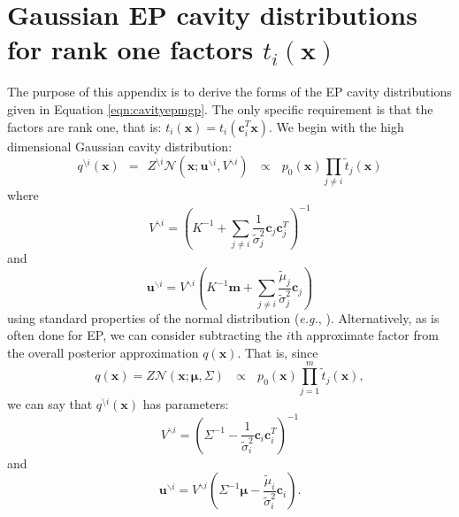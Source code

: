 \documentclass[twoside,11pt]{article}
\def\x{{\mathbf x}}
\def\c{{\mathbf c}}
\def\u{{\mathbf u}}
\def\m{{\mathbf m}}
\def\boldmu{\bm{\mu}}
\newcommand{\wo}{\setminus}
\begin{document}

\newpage

\appendix



\newpage

\appendix

\section{Gaussian EP cavity distributions for rank one factors $t_i(\x)$}
\label{sec:rank1cavity}

The purpose of this appendix is to derive the forms of the EP cavity distributions given in Equation \ref{eqn:cavityepmgp}.  The only specific requirement is that the factors are rank one, that is: $t_i(\x) = t_i(\c_i^T\x)$. We begin with the high dimensional Gaussian cavity distribution:
\begin{equation}
q^{\wo i}(\x) ~~=~~ Z^{\wo i}\mathcal{N}(\x; \u^{\backslash i}, V^{\backslash i}) ~~~\propto~~~ p_0(\x) \prod_{j\ne i} \tilde{t}_j(\x)
\end{equation}
where
%
\begin{equation}
V^{\backslash i} = \left(K^{-1}  + \sum_{j\ne i} \frac{1}{\tilde{\sigma}_j^2} \c_j\c_j^T\right)^{-1}
\end{equation}
%
and
%
\begin{equation}
\u^{\backslash i} = V^{\backslash i}\left(K^{-1}\m  + \sum_{j\ne i} \frac{\tilde{\mu}_j}{\tilde{\sigma}_j^2} \c_j\right)
\end{equation}
using standard properties of the normal distribution ({\it e.g.}, \cite{rasmussenBook}).  Alternatively, as is often done for EP, we can consider subtracting the $i$th approximate factor from the overall posterior approximation $q(\x)$.  That is, since
\begin{equation}
q(\x) = Z\mathcal{N}(\x; \boldmu, \Sigma) ~~~\propto~~~ p_0(\x) \overset{m}{\prod_{j=1}} \tilde{t}_j(\x),
\end{equation}
we can say that $q^{\wo i}(\x)$ has parameters:
%
\begin{equation}
\label{eqn:Vslash}
V^{\backslash i} = \left(\Sigma^{-1}  - \frac{1}{\tilde{\sigma}_i^2} \c_i\c_i^T\right)^{-1}
\end{equation}
%
and
%
\begin{equation}
\label{eqn:mslash}
\u^{\backslash i} = V^{\backslash i}\left(\Sigma^{-1}\boldmu  - \frac{\tilde{\mu}_i}{\tilde{\sigma}_i^2} \c_i\right).
\end{equation}
\end{document}
